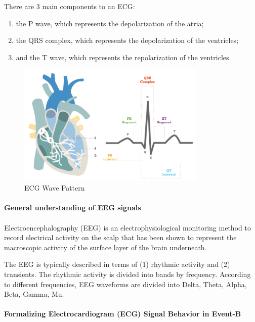 \documentclass{article}
\begin{document}
There are 3 main components to an ECG:

\begin{enumerate}
  \item the P wave, which represents the depolarization of the atria; 
  \item the QRS complex, which represents the depolarization of the ventricles; 
  \item and the T wave, which represents the repolarization of the ventricles.
\end{enumerate}

\begin{figure}[htbp] 
\centering 
\includegraphics[width=0.8\textwidth]{ECG.png} 
\caption{ECG Wave Pattern} 
\label{Fig.main1} 
\end{figure}

\paragraph{General understanding of EEG signals} 

\paragraph{}

Electroencephalography (EEG) is an electrophysiological monitoring method to record electrical activity on the scalp that has been shown to represent the macroscopic activity of the surface layer of the brain underneath\cite{ref2}.

The EEG is typically described in terms of (1) rhythmic activity and (2) transients. The rhythmic activity is divided into bands by frequency. According to different frequencies, EEG waveforms are divided into Delta, Theta, Alpha, Beta, Gamma, Mu.

\paragraph{Formalizing Electrocardiogram (ECG) Signal Behavior in Event-B} 
\end{document}
